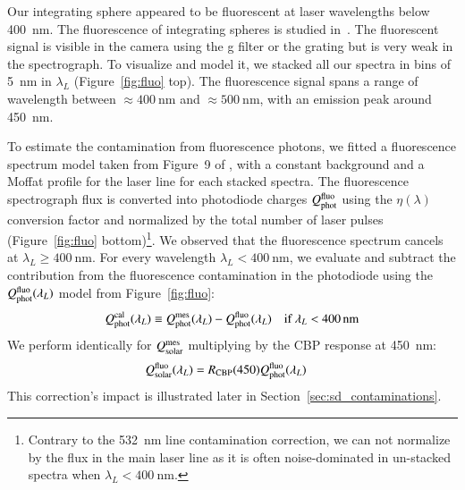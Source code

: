 Our integrating sphere appeared to be fluorescent at laser wavelengths below \SI{400}{\nano\meter}. The fluorescence of integrating spheres is studied in~\cite{shaw2007ultraviolet}. The fluorescent signal is visible in the \SD camera using the g filter or the grating but is very weak in the spectrograph. To visualize and model it, we stacked all our spectra in bins of \SI{5}{\nano\meter} in $\lambda_L$ (Figure~\ref{fig:fluo} top). The fluorescence signal spans a range of wavelength between $\approx \SI{400}{\nano\meter}$ and $\approx\SI{500}{\nano\meter}$, with an emission peak around \SI{450}{\nano\meter}. %

To estimate the contamination from fluorescence photons, we fitted a fluorescence spectrum model taken from Figure~9 of \cite{shaw2007ultraviolet}, with a constant background and a Moffat profile for the laser line for each stacked spectra. The fluorescence spectrograph flux is converted into photodiode charges $Q_{\mathrm{phot}}^{\mathrm{fluo}}$ using the $\eta(\lambda)$ conversion factor and normalized by the total number of laser pulses (Figure~\ref{fig:fluo} bottom)\footnote{Contrary to the \SI{532}{\nano\meter} line contamination correction, we can not normalize by the flux in the main laser line as it is often noise-dominated in un-stacked spectra when $\lambda_L < \SI{400}{\nano\meter}$.}. We observed that the fluorescence spectrum cancels at $\lambda_L \geq \SI{400}{\nano\meter}$. For every wavelength $\lambda_L < \SI{400}{\nano\meter}$, we evaluate and subtract the contribution from the fluorescence contamination in the photodiode using the $Q_{\mathrm{phot}}^{\mathrm{fluo}}(\lambda_L)$ model from Figure~\ref{fig:fluo}:
\begin{equation}
        Q_{\mathrm{phot}}^{\mathrm{cal}}(\lambda_L) \equiv  Q_{\mathrm{phot}}^{\mathrm{mes}}(\lambda_L) - Q_{\mathrm{phot}}^{\mathrm{fluo}}(\lambda_L) \quad\text{if}\ \lambda_L < \SI{400}{\nano\meter}
        \label{eq:qphot_calfluo}
\end{equation}
We perform identically for $Q_{\mathrm{solar}}^{\mathrm{mes}}$ multiplying by the CBP response at \SI{450}{\nano\meter}: 
\begin{equation}
\begin{aligned}
    Q_{\mathrm{solar}}^{\rm fluo}(\lambda_L) & = R_{\mathrm{CBP}}(450)  Q_{\mathrm{phot}}^{\rm fluo}(\lambda_L)
    \label{eq:qsolar_calfluo}
\end{aligned}
\end{equation}
This correction's impact is illustrated later in Section~\ref{sec:sd_contaminations}.

